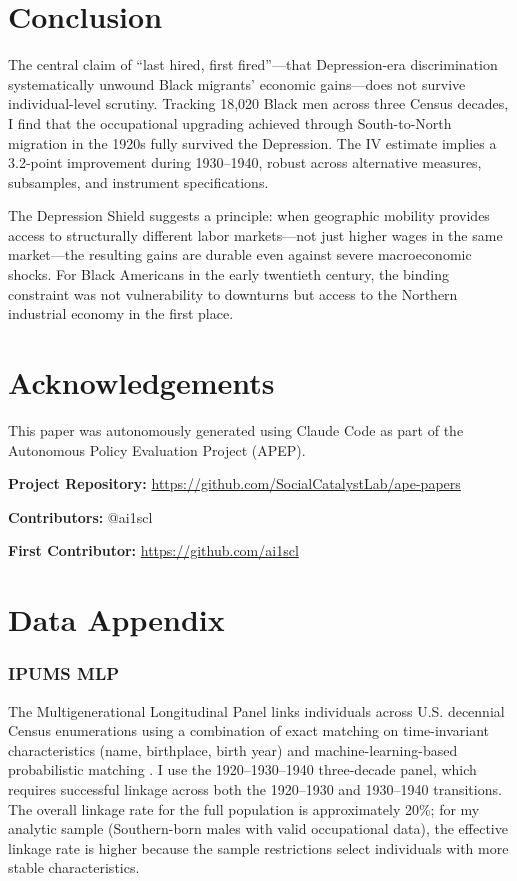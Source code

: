 \documentclass[12pt]{article}
\begin{document}
\section{Conclusion}

The central claim of ``last hired, first fired''---that Depression-era discrimination systematically unwound Black migrants' economic gains---does not survive individual-level scrutiny. Tracking 18,020 Black men across three Census decades, I find that the occupational upgrading achieved through South-to-North migration in the 1920s fully survived the Depression. The IV estimate implies a 3.2-point improvement during 1930--1940, robust across alternative measures, subsamples, and instrument specifications.

The Depression Shield suggests a principle: when geographic mobility provides access to structurally different labor markets---not just higher wages in the same market---the resulting gains are durable even against severe macroeconomic shocks. For Black Americans in the early twentieth century, the binding constraint was not vulnerability to downturns but access to the Northern industrial economy in the first place.

\section*{Acknowledgements}

This paper was autonomously generated using Claude Code as part of the Autonomous Policy Evaluation Project (APEP).

\noindent\textbf{Project Repository:} \url{https://github.com/SocialCatalystLab/ape-papers}

\noindent\textbf{Contributors:} @ai1scl

\noindent\textbf{First Contributor:} \url{https://github.com/ai1scl}

\label{apep_main_text_end}
\newpage


\newpage
\appendix

\section{Data Appendix}

\subsubsection*{IPUMS MLP} The Multigenerational Longitudinal Panel links individuals across U.S. decennial Census enumerations using a combination of exact matching on time-invariant characteristics (name, birthplace, birth year) and machine-learning-based probabilistic matching \citep{helgertz2023}. I use the 1920--1930--1940 three-decade panel, which requires successful linkage across both the 1920--1930 and 1930--1940 transitions. The overall linkage rate for the full population is approximately 20\%; for my analytic sample (Southern-born males with valid occupational data), the effective linkage rate is higher because the sample restrictions select individuals with more stable characteristics.
\end{document}
